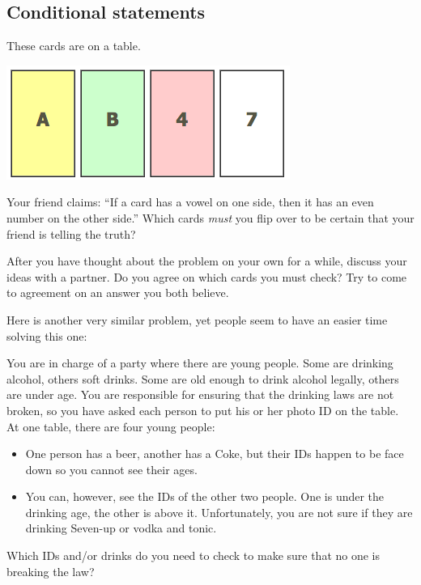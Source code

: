 \subsection{Conditional statements}
\begin{problem}
These cards are on a table.
\begin{center}
\includegraphics[height=3 cm]{../Pictures/ProbSolvingPics/cards}
\end{center}
Your friend claims: ``If a card has a vowel on one side, then it has an even number on the other side.'' Which cards \emph{must} you flip over to  be certain that your friend is telling the truth?
\end{problem}




\begin{thinkpair*}
After you have thought about the problem on your own for a while, discuss your ideas with a partner.  Do you agree on which cards you must check?   Try to come to agreement on an answer you both believe.
\end{thinkpair*}

Here is another very similar problem, yet people seem to have an easier time solving this one:


\begin{problem}
You are in charge of a party where there are young people. Some are drinking alcohol, others soft
drinks. Some are old enough to drink alcohol legally, others are under age. You are responsible for
ensuring that the drinking laws are not broken, so you have asked each person to put his or her
photo ID on the table. At one table, there are four young people:
\begin{itemize}
\item
One person has a beer, another has a
Coke, but their IDs happen to be face down so you cannot see their ages. 
\item
You can, however, see the
IDs of the other two people. One is under the drinking age, the other is above it. Unfortunately,
you are not sure if they are drinking Seven-up or vodka and tonic. 
\end{itemize}
Which IDs and/or drinks do you
need to check to make sure that no one is breaking the law?
\end{problem}


